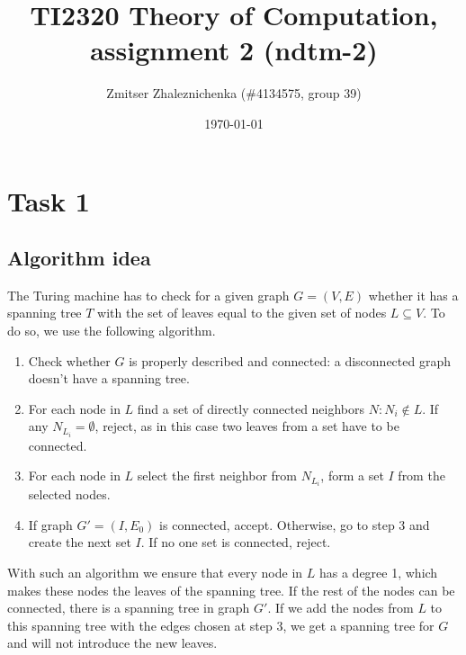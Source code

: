 \documentclass[a4paper, notitlepage]{article}
\begin{document}
\makeatletter
\renewcommand\paragraph{\@startsection{paragraph}{4}{\z@}%
  {-3.25ex\@plus -1ex \@minus -.2ex}%
  {1.5ex \@plus .2ex}%
  {\normalfont\normalsize\bfseries}}
\makeatother

\title{TI2320 Theory of Computation, assignment 2 (ndtm-2)} 
\author{Zmitser Zhaleznichenka (\#4134575, group 39)}
\date{\today}
\maketitle

\setcounter{secnumdepth}{0}

\section{Task 1}

\subsection{Algorithm idea}

The Turing machine has to check for a given graph $G = (V, E)$ whether it has a spanning tree $T$ with the set of leaves equal to the given set of nodes $L \subseteq V$. To do so, we use the following algorithm.

\begin{enumerate}
\item Check whether $G$ is properly described and connected: a disconnected graph doesn't have a spanning tree.
\item For each node in $L$ find a set of directly connected neighbors $N : N_i \notin L$. If any $N_{L_i} = \emptyset$, reject, as in this case two leaves from a set have to be connected.
\item For each node in $L$ select the first neighbor from $N_{L_i}$, form a set $I$ from the selected nodes. 
\item If graph $G' = (I, E_0)$ is connected, accept. Otherwise, go to step 3 and create the next set $I$. If no one set is connected, reject.
\end{enumerate}

With such an algorithm we ensure that every node in $L$ has a degree 1, which makes these nodes the leaves of the spanning tree. If the rest of the nodes can be connected, there is a spanning tree in graph $G'$. If we add the nodes from $L$ to this spanning tree with the edges chosen at step 3, we get a spanning tree for $G$ and will not introduce the new leaves.
\end{document}
